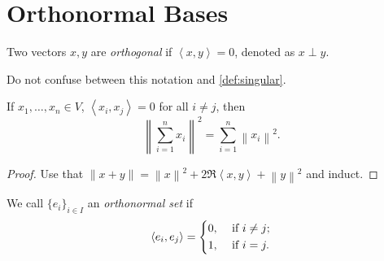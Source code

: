 \section{Orthonormal Bases}
\begin{definition}[Orthogonal]\label{def:orthogonal}
	Two vectors \(x, y\) are \emph{orthogonal} if \(\left< x,y \right> = 0\), denoted as \(x \perp y\).
\end{definition}
\begin{remark}
	Do not confuse between this notation and \autoref{def:singular}.
\end{remark}

\begin{lemma}\label{thm:Pythagorean-theorem}
	If \(x_1,\dots,x_n \in V\), \(\left< x_i,x_j \right> = 0\) for all \(i \neq j\), then
	\[
		\left\lVert \sum_{i=1}^{n} x_{i} \right\rVert ^{2} = \sum_{i=1}^{n} \left\lVert x_{i} \right\rVert ^{2}.
	\]
\end{lemma}
\begin{proof}
	Use that \(\left\lVert x + y\right\rVert =\left\lVert x\right\rVert^2 + 2\Re\left< x,y \right> + \left\lVert y\right\rVert^2\) and induct.
\end{proof}

\begin{definition}\label{def:orthonormal-set}
	We call \(\{e_i\}_{i \in I}\) an \emph{orthonormal set} if
	\[
		\left< e_i,e_j \right> = \begin{dcases}
			0, & \text{ if } i \neq j ; \\
			1, & \text{ if } i = j .
		\end{dcases}
	\]
\end{definition}